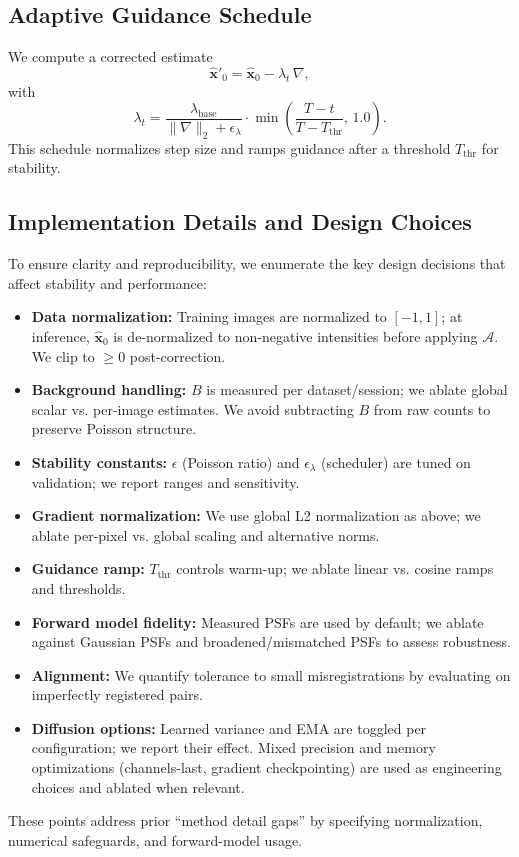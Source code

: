 \documentclass{article}
\begin{document}
\subsection{Adaptive Guidance Schedule}
We compute a corrected estimate
\begin{equation}
\hat{\mathbf{x}}'_0 = \hat{\mathbf{x}}_0 - \lambda_t\,\nabla,
\end{equation}
with
\begin{equation}
\lambda_t = \frac{\lambda_{\text{base}}}{\lVert\nabla\rVert_2 + \epsilon_\lambda}\cdot \min\left(\frac{T-t}{T-T_{\text{thr}}},\,1.0\right).
\end{equation}
This schedule normalizes step size and ramps guidance after a threshold $T_{\text{thr}}$ for stability.

\subsection{Implementation Details and Design Choices}
To ensure clarity and reproducibility, we enumerate the key design decisions that affect stability and performance:
\begin{itemize}
    \item \textbf{Data normalization:} Training images are normalized to $[-1,1]$; at inference, $\hat{\mathbf{x}}_0$ is de-normalized to non-negative intensities before applying $\mathcal{A}$. We clip to $\ge 0$ post-correction.
    \item \textbf{Background handling:} $B$ is measured per dataset/session; we ablate global scalar vs. per-image estimates. We avoid subtracting $B$ from raw counts to preserve Poisson structure.
    \item \textbf{Stability constants:} $\epsilon$ (Poisson ratio) and $\epsilon_\lambda$ (scheduler) are tuned on validation; we report ranges and sensitivity.
    \item \textbf{Gradient normalization:} We use global L2 normalization as above; we ablate per-pixel vs. global scaling and alternative norms.
    \item \textbf{Guidance ramp:} $T_{\text{thr}}$ controls warm-up; we ablate linear vs. cosine ramps and thresholds.
    \item \textbf{Forward model fidelity:} Measured PSFs are used by default; we ablate against Gaussian PSFs and broadened/mismatched PSFs to assess robustness.
    \item \textbf{Alignment:} We quantify tolerance to small misregistrations by evaluating on imperfectly registered pairs.
    \item \textbf{Diffusion options:} Learned variance and EMA are toggled per configuration; we report their effect. Mixed precision and memory optimizations (channels-last, gradient checkpointing) are used as engineering choices and ablated when relevant.
\end{itemize}
These points address prior “method detail gaps” by specifying normalization, numerical safeguards, and forward-model usage.
\end{document}
